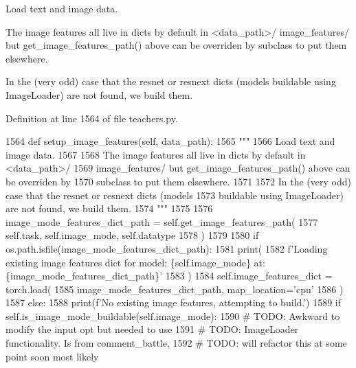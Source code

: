 \begin{DoxyVerb}Load text and image data.

The image features all live in dicts by default in <data_path>/
image_features/ but get_image_features_path() above can be overriden by
subclass to put them elsewhere.

In the (very odd) case that the resnet or resnext dicts (models
buildable using ImageLoader) are not found, we build them.
\end{DoxyVerb}
 

Definition at line 1564 of file teachers.\+py.


\begin{DoxyCode}
1564     \textcolor{keyword}{def }setup\_image\_features(self, data\_path):
1565         \textcolor{stringliteral}{"""}
1566 \textcolor{stringliteral}{        Load text and image data.}
1567 \textcolor{stringliteral}{}
1568 \textcolor{stringliteral}{        The image features all live in dicts by default in <data\_path>/}
1569 \textcolor{stringliteral}{        image\_features/ but get\_image\_features\_path() above can be overriden by}
1570 \textcolor{stringliteral}{        subclass to put them elsewhere.}
1571 \textcolor{stringliteral}{}
1572 \textcolor{stringliteral}{        In the (very odd) case that the resnet or resnext dicts (models}
1573 \textcolor{stringliteral}{        buildable using ImageLoader) are not found, we build them.}
1574 \textcolor{stringliteral}{        """}
1575 
1576         image\_mode\_features\_dict\_path = self.get\_image\_features\_path(
1577             self.task, self.image\_mode, self.datatype
1578         )
1579 
1580         \textcolor{keywordflow}{if} os.path.isfile(image\_mode\_features\_dict\_path):
1581             print(
1582                 f\textcolor{stringliteral}{'Loading existing image features dict for model: \{self.image\_mode\} at:
       \{image\_mode\_features\_dict\_path\}'}
1583             )
1584             self.image\_features\_dict = torch.load(
1585                 image\_mode\_features\_dict\_path, map\_location=\textcolor{stringliteral}{'cpu'}
1586             )
1587         \textcolor{keywordflow}{else}:
1588             print(f\textcolor{stringliteral}{'No existing image features, attempting to build.'})
1589             \textcolor{keywordflow}{if} self.is\_image\_mode\_buildable(self.image\_mode):
1590                 \textcolor{comment}{# TODO: Awkward to modify the input opt but needed to use}
1591                 \textcolor{comment}{# TODO: ImageLoader functionality. Is from comment\_battle,}
1592                 \textcolor{comment}{# TODO: will refactor this at some point soon most likely}

\end{DoxyCode}
